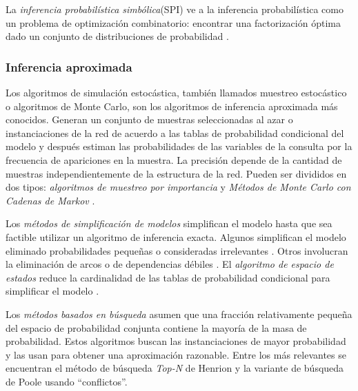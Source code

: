 La \textit{inferencia probabilística simbólica}(SPI) ve a la inferencia probabilística como un problema de optimización combinatorio: encontrar una factorización óptima dado un conjunto de distribuciones de probabilidad \cite{LI199455}.

\subsubsection{Inferencia aproximada}

Los algoritmos de simulación estocástica, también llamados muestreo estocástico o algoritmos de Monte Carlo, son los algoritmos de inferencia aproximada más conocidos. Generan un conjunto de muestras seleccionadas al azar o instanciaciones de la red de acuerdo a las tablas de probabilidad condicional del modelo y después estiman las probabilidades de las variables de la consulta por la frecuencia de apariciones en la muestra. La precisión depende de la cantidad de muestras independientemente de la estructura de la red. Pueden ser divididos en dos tipos: \textit{algoritmos de muestreo por importancia} y \textit{Métodos de Monte Carlo con Cadenas de Markov} \cite{guo2002survey}.

Los \textit{métodos de simplificación de modelos} simplifican el modelo hasta que sea factible utilizar un algoritmo de inferencia exacta. Algunos simplifican el modelo eliminado probabilidades pequeñas o consideradas irrelevantes \cite{jensen2013approximations}. Otros involucran la eliminación de arcos \cite{van1997approximating} o de dependencias débiles \cite{kjaerulff1994reduction}. El \textit{algoritmo de espacio de estados} reduce la cardinalidad de las tablas de probabilidad condicional para simplificar el modelo \cite{wellman1994state}.

Los \textit{métodos basados en búsqueda} asumen que una fracción relativamente pequeña del espacio de probabilidad conjunta contiene la mayoría de la masa de probabilidad. Estos algoritmos buscan las instanciaciones de mayor probabilidad y las usan para obtener una aproximación razonable. Entre los más relevantes se encuentran el método de búsqueda \textit{Top-N} de Henrion \cite{henrion1991search} y la variante de búsqueda de Poole usando \textquotedblleft conflictos\textquotedblright \cite{poole1993use, poole1996probabilistic}.

